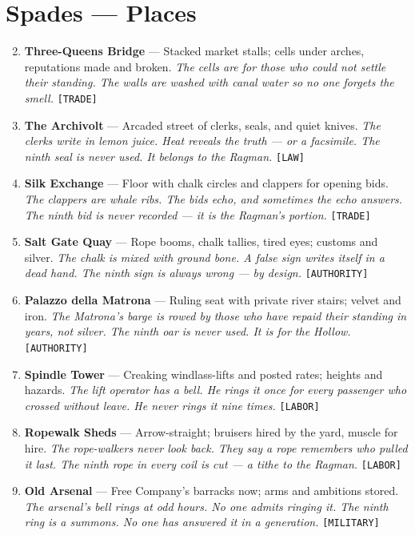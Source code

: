 \section*{Spades --- Places}
\label{sec:silkstrand-places}
\begin{enumerate}
\setcounter{enumi}{1}
\item \textbf{Three-Queens Bridge} --- Stacked market stalls; cells under arches, reputations made and broken.
  \hfill \textit{The cells are for those who could not settle their standing. The walls are washed with canal water so no one forgets the smell.} \texttt{[TRADE]}
\item \textbf{The Archivolt} --- Arcaded street of clerks, seals, and quiet knives.
  \hfill \textit{The clerks write in lemon juice. Heat reveals the truth --- or a facsimile. The ninth seal is never used. It belongs to the Ragman.} \texttt{[LAW]}
\item \textbf{Silk Exchange} --- Floor with chalk circles and clappers for opening bids.
  \hfill \textit{The clappers are whale ribs. The bids echo, and sometimes the echo answers. The ninth bid is never recorded --- it is the Ragman's portion.} \texttt{[TRADE]}
\item \textbf{Salt Gate Quay} --- Rope booms, chalk tallies, tired eyes; customs and silver.
  \hfill \textit{The chalk is mixed with ground bone. A false sign writes itself in a dead hand. The ninth sign is always wrong --- by design.} \texttt{[AUTHORITY]}
\item \textbf{Palazzo della Matrona} --- Ruling seat with private river stairs; velvet and iron.
  \hfill \textit{The Matrona's barge is rowed by those who have repaid their standing in years, not silver. The ninth oar is never used. It is for the Hollow.} \texttt{[AUTHORITY]}
\item \textbf{Spindle Tower} --- Creaking windlass-lifts and posted rates; heights and hazards.
  \hfill \textit{The lift operator has a bell. He rings it once for every passenger who crossed without leave. He never rings it nine times.} \texttt{[LABOR]}
\item \textbf{Ropewalk Sheds} --- Arrow-straight; bruisers hired by the yard, muscle for hire.
  \hfill \textit{The rope-walkers never look back. They say a rope remembers who pulled it last. The ninth rope in every coil is cut --- a tithe to the Ragman.} \texttt{[LABOR]}
\item \textbf{Old Arsenal} --- Free Company's barracks now; arms and ambitions stored.
  \hfill \textit{The arsenal's bell rings at odd hours. No one admits ringing it. The ninth ring is a summons. No one has answered it in a generation.} \texttt{[MILITARY]}

\end{enumerate}
